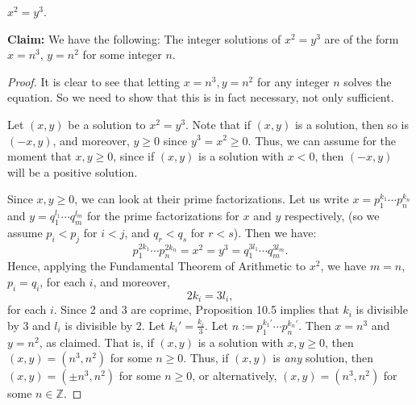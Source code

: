 \documentclass[11pt,dvipsnames]{book}
\numberwithin{figure}{section} %
\numberwithin{table}{section} %
\begin{document}
\begin{exercise}
$x^2 = y^3$.

\begin{solution}

{\bf Claim:} We have the following:
The integer solutions of $x^2=y^3$ are of the form $x=n^3$, $y=n^2$ for some integer $n$.

\begin{proof}
 It is clear to see that letting $x=n^3, y=n^2$ for any integer $n$ solves the equation.  So we need to show that this is in fact necessary, not only sufficient.

Let $(x,y)$ be a solution to $x^2=y^3$. Note that if $(x,y)$ is a solution, then so is $(-x,y)$, and moreover, $y\geq 0$ since $y^3=x^2\geq 0$. Thus, we can assume for the moment that $x,y\geq 0$, since if  $(x,y)$ is a solution with $x<0$, then $(-x,y)$ will be a positive solution.

Since $x,y\geq 0$, we can look at their prime factorizations. Let us write $x=p_1^{k_1}\cdots p_n^{k_n}$ and $y=q_1^{l_1}\cdots q_m^{l_m}$ for the prime factorizations for $x$ and $y$ respectively, (so we assume $p_i<p_j$ for $i<j$, and $q_r<q_s$ for $r<s$).  Then we have:
$$p_1^{2k_1}\cdots p_n^{2k_n} = x^2=y^3 = q_1^{3l_1}\cdots q_m^{3l_m}.$$
Hence, applying the Fundamental Theorem of Arithmetic to $x^2$, we have $m=n$, $p_i=q_i$, for each $i$, and moreover,
$$2k_i=3l_i,$$
for each $i$.  Since 2 and 3 are coprime, Proposition 10.5 implies that $k_i$ is divisible by 3 and $l_i$ is divisible by 2.  Let $k_i'=\frac{k_i}{3}$.  Let $n:= p_1^{k_1'}\cdots p_n^{k_n'}.$  Then $x=n^3$ and $y=n^2$, as claimed. That is, if $(x,y)$ is a solution with $x,y\geq 0$, then $(x,y)=(n^3,n^2)$ for some $n\geq 0$. Thus, if $(x,y)$ is {\it any } solution, then $(x,y)=(\pm n^3,n^2)$ for some $n\geq 0$, or alternatively, $(x,y)=(n^3,n^2)$ for some $n\in \mathbb{Z}$.
\end{proof}

\end{solution}

\end{exercise}
%
%
%
%
%
%
\end{document}

